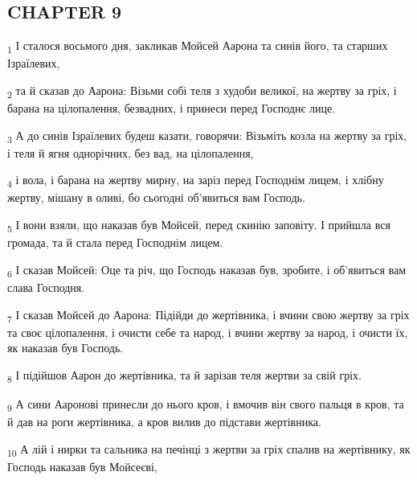 \subsection{CHAPTER 9}
\begin{tcolorbox}
\textsubscript{1} І сталося восьмого дня, закликав Мойсей Аарона та синів його, та старших Ізраїлевих,
\end{tcolorbox}
\begin{tcolorbox}
\textsubscript{2} та й сказав до Аарона: Візьми собі теля з худоби великої, на жертву за гріх, і барана на цілопалення, безвадних, і принеси перед Господнє лице.
\end{tcolorbox}
\begin{tcolorbox}
\textsubscript{3} А до синів Ізраїлевих будеш казати, говорячи: Візьміть козла на жертву за гріх, і теля й ягня однорічних, без вад, на цілопалення,
\end{tcolorbox}
\begin{tcolorbox}
\textsubscript{4} і вола, і барана на жертву мирну, на заріз перед Господнім лицем, і хлібну жертву, мішану в оливі, бо сьогодні об'явиться вам Господь.
\end{tcolorbox}
\begin{tcolorbox}
\textsubscript{5} І вони взяли, що наказав був Мойсей, перед скинію заповіту. І прийшла вся громада, та й стала перед Господнім лицем.
\end{tcolorbox}
\begin{tcolorbox}
\textsubscript{6} І сказав Мойсей: Оце та річ, що Господь наказав був, зробите, і об'явиться вам слава Господня.
\end{tcolorbox}
\begin{tcolorbox}
\textsubscript{7} І сказав Мойсей до Аарона: Підійди до жертівника, і вчини свою жертву за гріх та своє цілопалення, і очисти себе та народ, і вчини жертву за народ, і очисти їх, як наказав був Господь.
\end{tcolorbox}
\begin{tcolorbox}
\textsubscript{8} І підійшов Аарон до жертівника, та й зарізав теля жертви за свій гріх.
\end{tcolorbox}
\begin{tcolorbox}
\textsubscript{9} А сини Ааронові принесли до нього кров, і вмочив він свого пальця в кров, та й дав на роги жертівника, а кров вилив до підстави жертівника.
\end{tcolorbox}
\begin{tcolorbox}
\textsubscript{10} А лій і нирки та сальника на печінці з жертви за гріх спалив на жертівнику, як Господь наказав був Мойсеєві,
\end{tcolorbox}
